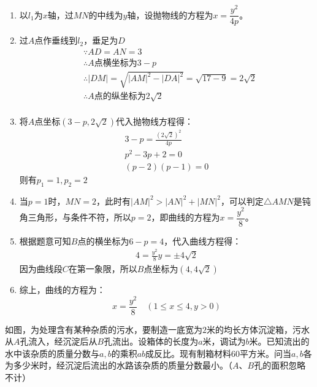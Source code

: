 \documentclass[answers]{exam}
\begin{document}
\begin{questions}
	\begin{solution}
		\begin{enumerate}[label=\protect\circled{\arabic*}]
			\item 以$l_1$为$x$轴，过$MN$的中线为$y$轴，设抛物线的方程为$x=\dfrac{y^2}{4p}$。
			\item 过$A$点作垂线到$l_2$，垂足为$D$
			      \begin{align*}
				       & \because AD = AN = 3                                                  \\
				       & \therefore A \text{点横坐标为} 3-p                                    \\
				       & \therefore  |DM| = \sqrt{|AM|^2 - |DA|^2} = \sqrt{17 - 9} = 2\sqrt{2} \\
				       & \therefore A\text{点的纵坐标为}2\sqrt{2}                              \\
			      \end{align*}
			\item 将$A$点坐标$(3-p, 2\sqrt{2})$代入抛物线方程得：
			      \begin{align*}
				      3-p = \frac{(2\sqrt{2})^2}{4p} \\
				      p^2 -3p + 2 = 0                \\
				      (p-2)(p-1) = 0
			      \end{align*}
			      则有$p_1 = 1, p_2 = 2$
			\item 当$p=1$时，$MN=2$，此时有$|AM|^2 > |AN|^2 +
				      |MN|^2$，可以判定$\triangle{AMN}$是钝角三角形，与条件不符，所以$p=2$，即曲线的方程为$x=\dfrac{y^2}{8}$。
			\item 根据题意可知$B$点的横坐标为$6-p=4$，代入曲线方程得：
			      \begin{align*}
				      4 = \frac{y^2}{8}
				      y = \pm4\sqrt{2}
			      \end{align*}
			      因为曲线段$C$在第一象限，所以$B$点坐标为$(4,4\sqrt{2})$

			\item 综上，曲线的方程为：
			      \begin{equation*}
				      x = \frac{y^2}{8} \quad (1 \leqslant x \leqslant 4, y>0)
			      \end{equation*}
		\end{enumerate}

	\end{solution}

	\question
	如图，为处理含有某种杂质的污水，要制造一底宽为$2$米的均长方体沉淀箱，污水从$A$孔流入，经沉淀后从$B$孔流出。设箱体的长度为$a$米，调试为$b$米。已知流出的水中该杂质的质量分数与$a,b$的乘积$ab$成反比。现有制箱材料$60$平方米。问当$a,b$各为多少米时，经沉淀后流出的水路该杂质的质量分数最小。（$A$、$B$孔的面积忽略不计）


\end{questions}
\end{document}
